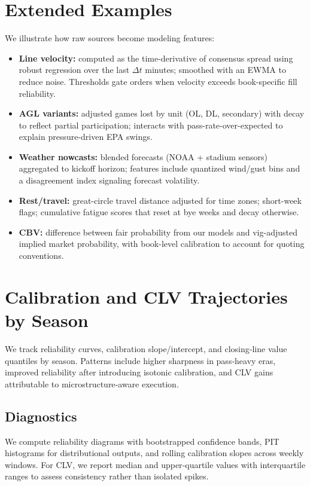 \documentclass[12pt]{report}  %
\numberwithin{equation}{section}
\theoremstyle{plain}
\theoremstyle{definition}
\theoremstyle{remark}
\begin{document}
\section{Extended Examples}
We illustrate how raw sources become modeling features:
\begin{itemize}
  \item \textbf{Line velocity:} computed as the time-derivative of consensus spread using robust regression over the last \(\Delta t\) minutes; smoothed with an EWMA to reduce noise. Thresholds gate orders when velocity exceeds book-specific fill reliability.
  \item \textbf{AGL variants:} adjusted games lost by unit (OL, DL, secondary) with decay to reflect partial participation; interacts with pass-rate-over-expected to explain pressure-driven EPA swings.
  \item \textbf{Weather nowcasts:} blended forecasts (NOAA + stadium sensors) aggregated to kickoff horizon; features include quantized wind/gust bins and a disagreement index signaling forecast volatility.
  \item \textbf{Rest/travel:} great-circle travel distance adjusted for time zones; short-week flags; cumulative fatigue scores that reset at bye weeks and decay otherwise.
  \item \textbf{CBV:} difference between fair probability from our models and vig-adjusted implied market probability, with book-level calibration to account for quoting conventions.
\end{itemize}

\section{Calibration and CLV Trajectories by Season}
We track reliability curves, calibration slope/intercept, and closing‑line value quantiles by season. Patterns include higher sharpness in pass‑heavy eras, improved reliability after introducing isotonic calibration, and CLV gains attributable to microstructure‑aware execution.

\subsection*{Diagnostics}
We compute reliability diagrams with bootstrapped confidence bands, PIT histograms for distributional outputs, and rolling calibration slopes across weekly windows. For CLV, we report median and upper‑quartile values with interquartile ranges to assess consistency rather than isolated spikes.
\end{document}
